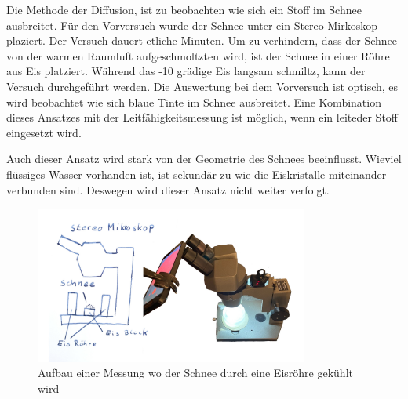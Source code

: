 
Die Methode der Diffusion, ist zu beobachten wie sich ein Stoff im Schnee ausbreitet. Für den Vorversuch wurde der Schnee unter ein Stereo Mirkoskop plaziert. Der Versuch dauert etliche Minuten. Um zu verhindern, dass der Schnee von der warmen Raumluft aufgeschmoltzten wird, ist der Schnee in einer Röhre aus Eis platziert. Während das -10 grädige Eis langsam schmiltz, kann der Versuch durchgeführt werden. Die Auswertung bei dem Vorversuch ist optisch, es wird beobachtet wie sich blaue Tinte im Schnee ausbreitet. Eine Kombination dieses Ansatzes mit der Leitfähigkeitsmessung ist möglich, wenn ein leiteder Stoff eingesetzt wird.

Auch dieser Ansatz wird stark von der Geometrie des Schnees beeinflusst. Wieviel flüssiges Wasser vorhanden ist, ist sekundär zu wie die Eiskristalle miteinander verbunden sind. Deswegen wird dieser Ansatz nicht weiter verfolgt.

\begin{figure}
    \centering
    \includegraphics[width=0.8\textwidth]{Bilder/freistellen.jpeg}
    \caption{Aufbau einer Messung wo der Schnee durch eine Eisröhre gekühlt wird}
    \label{fig:AutMess}
\end{figure}
